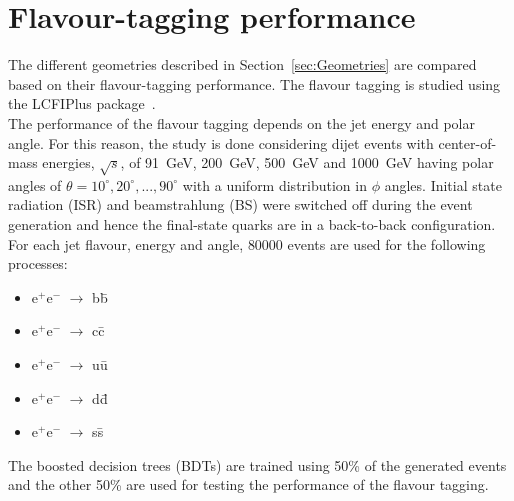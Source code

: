\section{Flavour-tagging performance}\label{sec:impactOfGeometries}

The different geometries described in Section~\ref{sec:Geometries} are compared based on their flavour-tagging performance. The flavour tagging is studied using the LCFIPlus package~\cite{website:LCFIPlus}. \\
The performance of the flavour tagging depends on the jet energy and polar angle. For this reason, the study is done considering dijet events with center-of-mass energies, $\sqrt{s}$, of 91~GeV, 200~GeV, 500~GeV and 1000~GeV having polar angles of $\theta=10^\circ, 20^\circ, ..., 90^\circ$ with a uniform distribution in $\phi$ angles. Initial state radiation (ISR) and beamstrahlung (BS) were switched off during the event generation and hence the final-state quarks are in a back-to-back configuration.\\
For each jet flavour, energy and angle, 80000 events are used for the following processes:
\begin{itemize}
\item e$^+$e$^-$ $\rightarrow$ b\={b}
\item e$^+$e$^-$ $\rightarrow$ c\={c}
\item e$^+$e$^-$ $\rightarrow$ u\={u}
\item e$^+$e$^-$ $\rightarrow$ d\={d}
\item e$^+$e$^-$ $\rightarrow$ s\={s}
\end{itemize}

The boosted decision trees (BDTs) are trained using 50\% of the generated events and the other 50\% are used for testing the performance of the flavour tagging.


